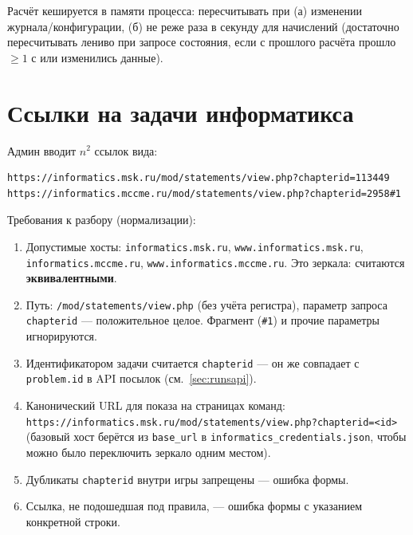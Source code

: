 \documentclass[12pt,a4paper]{article}
\newcommand{\field}[1]{\texttt{#1}}
\begin{document}
Расчёт кешируется в памяти процесса: пересчитывать при (а) изменении
журнала/конфигурации, (б) не реже раза в секунду для начислений (достаточно
пересчитывать лениво при запросе состояния, если с прошлого расчёта прошло
$\ge 1$ с или изменились данные).

\section{Ссылки на задачи информатикса}
\label{sec:urls}

Админ вводит $n^2$ ссылок вида:

\begin{small}\begin{verbatim}
https://informatics.msk.ru/mod/statements/view.php?chapterid=113449
https://informatics.mccme.ru/mod/statements/view.php?chapterid=2958#1
\end{verbatim}\end{small}

Требования к разбору (нормализации):

\begin{enumerate}[nosep]
  \item Допустимые хосты: \field{informatics.msk.ru},
        \field{www.informatics.msk.ru}, \field{informatics.mccme.ru},
        \field{www.informatics.mccme.ru}. Это зеркала: считаются
        \textbf{эквивалентными}.
  \item Путь: \field{/mod/statements/view.php} (без учёта регистра),
        параметр запроса \field{chapterid} --- положительное целое.
        Фрагмент (\field{\#1}) и прочие параметры игнорируются.
  \item Идентификатором задачи считается \field{chapterid} --- он же
        совпадает с \field{problem.id} в API посылок (см.~\ref{sec:runsapi}).
  \item Канонический URL для показа на страницах команд:
        \field{https://informatics.msk.ru/mod/statements/view.php?chapterid=<id>}
        (базовый хост берётся из \field{base\_url} в
        \field{informatics\_credentials.json}, чтобы можно было переключить
        зеркало одним местом).
  \item Дубликаты \field{chapterid} внутри игры запрещены --- ошибка формы.
  \item Ссылка, не подошедшая под правила, --- ошибка формы с указанием
        конкретной строки.
\end{enumerate}
\end{document}

